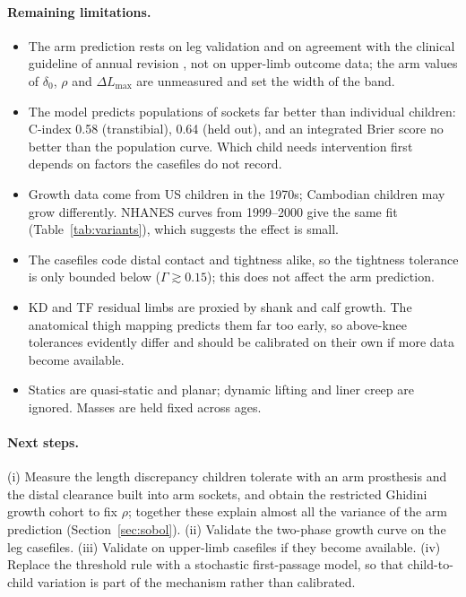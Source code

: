 \documentclass[11pt]{article}
\theoremstyle{definition}
\begin{document}
\paragraph{Remaining limitations.}
\begin{itemize}[leftmargin=1.4em,itemsep=1pt]
\item The arm prediction rests on leg validation and on agreement with the clinical guideline of annual revision \cite{atlas34}, not on upper-limb outcome data; the arm values of $\delta_0$, $\rho$ and $\Delta L_{\max}$ are unmeasured and set the width of the band.
\item The model predicts populations of sockets far better than individual children: C-index 0.58 (transtibial), 0.64 (held out), and an integrated Brier score no better than the population curve. Which child needs intervention first depends on factors the casefiles do not record.
\item Growth data come from US children in the 1970s; Cambodian children may grow differently. NHANES curves from 1999--2000 give the same fit (Table~\ref{tab:variants}), which suggests the effect is small.
\item The casefiles code distal contact and tightness alike, so the tightness tolerance is only bounded below ($\Gamma\gtrsim0.15$); this does not affect the arm prediction.
\item KD and TF residual limbs are proxied by shank and calf growth. The anatomical thigh mapping predicts them far too early, so above-knee tolerances evidently differ and should be calibrated on their own if more data become available.
\item Statics are quasi-static and planar; dynamic lifting and liner creep are ignored. Masses are held fixed across ages.
\end{itemize}

\paragraph{Next steps.} (i) Measure the length discrepancy children tolerate with an arm prosthesis and the distal clearance built into arm sockets, and obtain the restricted Ghidini growth cohort \cite{ghidiniGrowth} to fix $\rho$; together these explain almost all the variance of the arm prediction (Section~\ref{sec:sobol}). (ii) Validate the two-phase growth curve on the leg casefiles. (iii) Validate on upper-limb casefiles if they become available. (iv) Replace the threshold rule with a stochastic first-passage model, so that child-to-child variation is part of the mechanism rather than calibrated.
\end{document}
